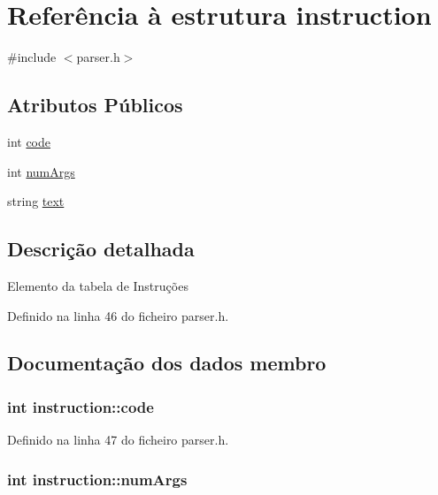\hypertarget{structinstruction}{\section{Referência à estrutura instruction}
\label{structinstruction}
}


{\ttfamily \#include $<$parser.\-h$>$}

\subsection*{Atributos Públicos}
\begin{DoxyCompactItemize}
\item 
int \hyperlink{structinstruction_a20ba1219d473773f35384214c08f717c}{code}
\item 
int \hyperlink{structinstruction_abb5712c98f149b197b5c58b2dac15a03}{num\-Args}
\item 
string \hyperlink{structinstruction_af31af10ecfe7d2fdf154616d0aede8ea}{text}
\end{DoxyCompactItemize}


\subsection{Descrição detalhada}
Elemento da tabela de Instruções 

Definido na linha 46 do ficheiro parser.\-h.



\subsection{Documentação dos dados membro}
\hypertarget{structinstruction_a20ba1219d473773f35384214c08f717c}{
\subsubsection[{code}]{\setlength{\rightskip}{0pt plus 5cm}int instruction\-::code}}\label{structinstruction_a20ba1219d473773f35384214c08f717c}


Definido na linha 47 do ficheiro parser.\-h.

\hypertarget{structinstruction_abb5712c98f149b197b5c58b2dac15a03}{
\subsubsection[{num\-Args}]{\setlength{\rightskip}{0pt plus 5cm}int instruction\-::num\-Args}}\label{structinstruction_abb5712c98f149b197b5c58b2dac15a03}


